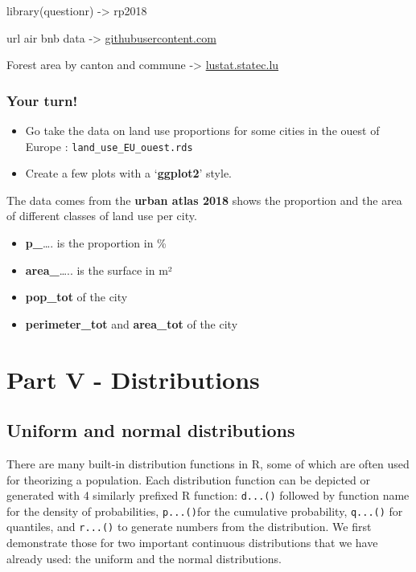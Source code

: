 \documentclass[
  letterpaper,
  DIV=11,
  numbers=noendperiod]{scrreprt}
\begin{document}
library(questionr) -\textgreater{} rp2018

url air bnb data -\textgreater{}
\href{https://raw.githubusercontent.com/holtzy/data_to_viz/master/Example_dataset/1_OneNum.csv}{githubusercontent.com}

Forest area by canton and commune -\textgreater{}
\href{https://lustat.statec.lu/vis?fs\%5B0\%5D=Th\%C3\%A8mes\%2C1\%7CTerritoire\%20environnement\%20et\%20\%C3\%A9nergie\%23A\%23\%7CEnvironnement\%23A3\%23&pg=20&fc=Th\%C3\%A8mes&df\%5Bds\%5D=ds-release&df\%5Bid\%5D=DF_X038&df\%5Bag\%5D=LU1&df\%5Bvs\%5D=1.0&pd=2010\%2C2010&dq=..A}{lustat.statec.lu}

\section{Your turn!}\label{your-turn}

\begin{itemize}
\item
  Go take the data on land use proportions for some cities in the ouest
  of Europe : \texttt{land\_use\_EU\_ouest.rds}
\item
  Create a few plots with a `\textbf{ggplot2}' style.
\end{itemize}

The data comes from the \textbf{urban atlas 2018} shows the proportion
and the area of different classes of land use per city.

\begin{itemize}
\item
  \textbf{p\_}\ldots. is the proportion in \%
\item
  \textbf{area\_}\ldots.. is the surface in m²
\item
  \textbf{pop\_tot} of the city
\item
  \textbf{perimeter\_tot} and \textbf{area\_tot} of the city
\end{itemize}

\part{Part V - Distributions}

\chapter{Uniform and normal
distributions}\label{sec-uniform-and-normal-distributions}

There are many built-in distribution functions in R, some of which are
often used for theorizing a population. Each distribution function can
be depicted or generated with 4 similarly prefixed R function:
\texttt{d...()} followed by function name for the density of
probabilities, \texttt{p...()}for the cumulative probability,
\texttt{q...()} for quantiles, and \texttt{r...()} to generate numbers
from the distribution. We first demonstrate those for two important
continuous distributions that we have already used: the uniform and the
normal distributions.
\end{document}
